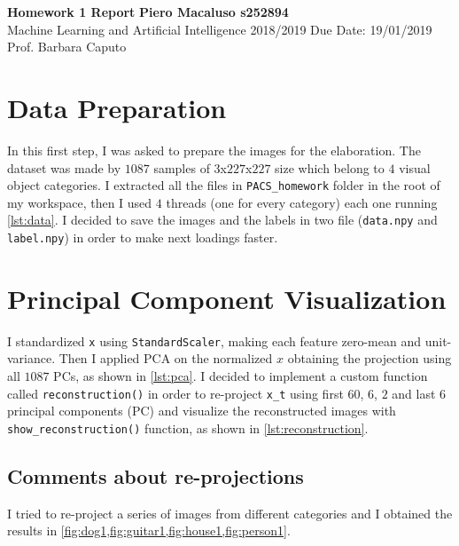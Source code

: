 \documentclass[a4paper, 11pt]{article}
\begin{document}
	\noindent
	\large\textbf{Homework 1 Report} \hfill \textbf{Piero Macaluso s252894} \\
	\normalsize Machine Learning and Artificial Intelligence 2018/2019 \hfill Due Date: 19/01/2019 \\
	Prof. Barbara Caputo  
	
	\section{Data Preparation}
	\showthe\columnwidth
	
	In this first step, I was asked to prepare the images for the elaboration. The dataset was made by $1087$ samples of $3$x$227$x$227$ size which belong to $4$ visual object categories.
	I extracted all the files in \texttt{PACS\_homework} folder in the root  of my workspace, then I used $4$ threads (one for every category) each one running \vref{lst:data}.
	I decided to save the images and the labels in two file (\texttt{data.npy} and \texttt{label.npy}) in order to make next loadings faster.
	
		
	\section{Principal Component Visualization}
	I standardized \texttt{x} using \texttt{StandardScaler}, making each feature zero-mean and unit-variance. Then I applied PCA on the normalized $x$ obtaining the projection using all $1087$ PCs, as shown in \vref{lst:pca}.
	I decided to implement a custom function called \texttt{reconstruction()} in order to re-project \texttt{x\_t} using first $60$, $6$, $2$ and last $6$ principal components (PC) and visualize the reconstructed images with \texttt{show\_reconstruction()} function, as shown in \vref{lst:reconstruction}.
	
	
	
	
	
	\subsection{Comments about re-projections}
	I tried to re-project a series of images from different categories and I obtained the results in \vref{fig:dog1,fig:guitar1,fig:house1,fig:person1}.
	
\end{document}
